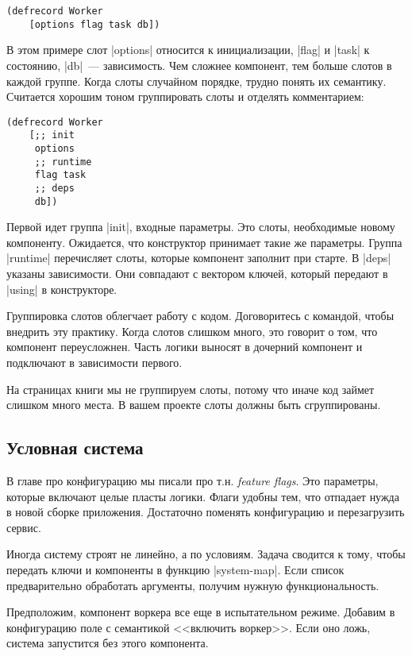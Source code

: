 \begin{verbatim}
(defrecord Worker
    [options flag task db])
\end{verbatim}

В этом примере слот \spverb|options| относится к инициализации, \spverb|flag| и
\spverb|task| к состоянию, \spverb|db|~--- зависимость. Чем сложнее компонент,
тем больше слотов в каждой группе. Когда слоты случайном порядке, трудно понять
их семантику. Считается хорошим тоном группировать слоты и отделять
комментарием:

\begin{verbatim}
(defrecord Worker
    [;; init
     options
     ;; runtime
     flag task
     ;; deps
     db])
\end{verbatim}

Первой идет группа \spverb|init|, входные параметры. Это слоты, необходимые
новому компоненту. Ожидается, что конструктор принимает такие же
параметры. Группа \spverb|runtime| перечисляет слоты, которые компонент заполнит
при старте. В \spverb|deps| указаны зависимости. Они совпадают с вектором
ключей, который передают в \spverb|using| в конструкторе.

Группировка слотов облегчает работу с кодом. Договоритесь с командой, чтобы
внедрить эту практику. Когда слотов слишком много, это говорит о том, что
компонент переусложнен. Часть логики выносят в дочерний компонент и подключают в
зависимости первого.

На страницах книги мы не группируем слоты, потому что иначе код займет слишком
много места. В вашем проекте слоты должны быть сгруппированы.

\subsection{Условная система}


В главе про конфигурацию мы писали про т.н. \emph{feature flags}. Это параметры,
которые включают целые пласты логики. Флаги удобны тем, что отпадает нужда в
новой сборке приложения. Достаточно поменять конфигурацию и перезагрузить
сервис.

Иногда систему строят не линейно, а по условиям. Задача сводится к тому, чтобы
передать ключи и компоненты в функцию \spverb|system-map|. Если список
предварительно обработать аргументы, получим нужную функциональность.

Предположим, компонент воркера все еще в испытательном режиме. Добавим в
конфигурацию поле с семантикой <<включить воркер>>. Если оно ложь, система
запустится без этого компонента.

